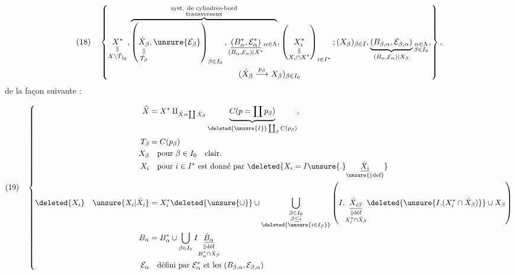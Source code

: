 \[
(18)\quad\left\{
\begin{gathered}
\underset{\substack{\parallel\\X\setminus\mathring T_{I_0}}}{X^*},
\overbrace{
\left(\underset{\substack{\parallel\\\dot T_\beta}}{\dot X_\beta},
\unsure{\mathcal E_\beta}\right)_{\beta\in I_0},
\underset{(B_\alpha,\mathcal E_\alpha)|X^*}
{\underline{(B_\alpha^*,\mathcal E_\alpha^*)}}{}_{\alpha\in\Lambda}
}^{\substack{\text{syst. de cylindres-bord}\\\text{transversaux}}},
\left(\underset{\substack{\parallel\\X_i\cap X^*}}{X_i^*}\right)_{i\in I^*};
(X_\beta)_{\beta\in I},
\underbrace{(B_{\beta,\alpha},\mathcal E_{\beta,\alpha})}
_{(B_\alpha,\mathcal E_\alpha)|X_\beta}
{}_{\substack{\alpha\in\Lambda\\\beta\in I_0}},\\
(\dot X_\beta\overset{p_\beta}\longrightarrow X_\beta)_{\beta\in I_0}
\end{gathered}\right\},
\]
de la façon suivante :

\[
(19)\quad\left\{
\begin{aligned}
\widehat X&=X^*\amalg_{\dot X=\coprod\dot X_\beta}
\underbrace{C(p=\coprod p_\beta)}
_{\deleted{\unsure{I}}\coprod_\beta C(p_\beta)},\\
T_\beta&=C(p_\beta)\\
X_\beta&\quad\text{pour }\beta\in I_0\quad\text{clair}.\\
X_i&\quad\text{pour }i\in I^*\text{ est donné par }
\deleted{X_i=I\unsure{.}\underset{\unsure{\parallel\text{def}}}{\underline{\dot X_i}}}\\
\deleted{X_i}\quad\unsure{X_i|\bar X_i}&=X_i^*\deleted{\unsure{\cup}}
\cup\bigcup_{\substack{\beta\in I_0\\\beta\le i\\\deleted{\unsure{i\in I_\beta}}}}
\left(I.\underset{\substack{\parallel\text{déf}\\X_i^*\cap\dot X_\beta}}
{\underline{\dot X_{i\beta}}}
\deleted{\unsure{I.(X_i^*\cap\dot X_\beta)}}\cup X_\beta\right)\\
B_\alpha&=B_\alpha^*\cup\bigcup_{\beta\in I_0}
I\underset{\substack{\parallel\text{déf}\\B_\alpha^*\cap\dot X_\beta}}
{\underline{\dot B_\alpha}}\\
\mathcal E_\alpha&\quad\text{défini par }\mathcal E_\alpha^*
\text{ et les }(B_{\beta,\alpha},\mathcal E_{\beta,\alpha})
\end{aligned}\right.
\]

